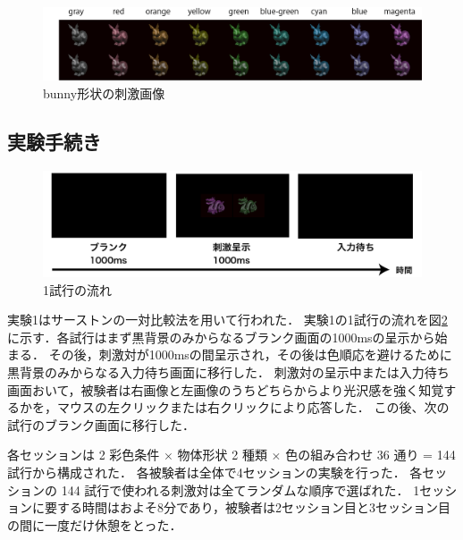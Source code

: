             \begin{figure}[h]
                \centering
                \includegraphics[width=14.0cm]{./img/ex1_stimuli_b_p.png}
                \caption{bunny形状の刺激画像}
                \label{ex1_stimuli_b}
            \end{figure}

        \subsection{実験手続き}

            \begin{figure}[h]
                \centering
                \includegraphics[width=14.0cm]{./img/ex1_procedure.png}
                \caption{1試行の流れ}
                \label{ex1_procedure}
            \end{figure}

            実験1はサーストンの一対比較法を用いて行われた．
            実験1の1試行の流れを図\ref{ex1_procedure}に示す．各試行はまず黒背景のみからなるブランク画面の1000msの呈示から始まる．
            その後，刺激対が1000msの間呈示され，その後は色順応を避けるために黒背景のみからなる入力待ち画面に移行した．
            刺激対の呈示中または入力待ち画面おいて，被験者は右画像と左画像のうちどちらからより光沢感を強く知覚するかを，マウスの左クリックまたは右クリックにより応答した．
            この後、次の試行のブランク画面に移行した．

            各セッションは 2 彩色条件 $\times$ 物体形状 2 種類 $\times$ 色の組み合わせ 36 通り = 144 試行から構成された．
            各被験者は全体で4セッションの実験を行った．
            各セッションの 144 試行で使われる刺激対は全てランダムな順序で選ばれた．
            1セッションに要する時間はおよそ8分であり，被験者は2セッション目と3セッション目の間に一度だけ休憩をとった．



